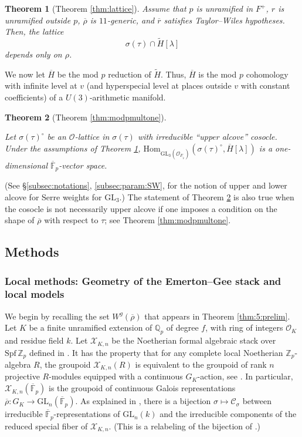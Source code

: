 \documentclass[oneside,a4paper,english, 11pt]{amsart}
\theoremstyle{plain}
\newtheorem{thm}{Theorem}[subsection]
\theoremstyle{plain}
\theoremstyle{plain}
\theoremstyle{plain}
\theoremstyle{plain}
\theoremstyle{plain}
\theoremstyle{definition}
\theoremstyle{definition}
\theoremstyle{definition}
\theoremstyle{remark}
\numberwithin{equation}{section}
\newcommand{\Qp}{\mathbb{Q}_p}
\newcommand{\F}{\mathbb{F}}
\newcommand{\cC}{\mathcal{C}}
\newcommand{\cO}{\mathcal{O}}
\newcommand{\cX}{\mathcal{X}}
\newcommand{\Zp}{\mathbb{Z}_p}
\newcommand{\Hom}{\mathrm{Hom}}
\newcommand{\GL}{\mathrm{GL}}
\newcommand{\tld}[1]{\widetilde{#1}}
\newcommand{\rbar}{\overline{r}}
\newcommand{\rhobar}{\overline{\rho}}
\newcommand{\Spf}{\mathrm{Spf}}
\newcommand{\ovl}[1]{\overline{#1}}
\begin{document}
\begin{thm}[Theorem \ref{thm:lattice}]
\label{mainthm1} 
Assume that $p$ is unramified in $F^+$, $r$ is unramified outside $p$, $\rhobar$ is $11$-generic, and $\rbar$ satisfies Taylor--Wiles hypotheses.
%
Then, the lattice 
\[
\sigma(\tau) \cap \tld{H}[\lambda]
\]
depends only on $\rho$.
\end{thm}

We now let $\overline{H}$ be the mod $p$ reduction of $\tld{H}$.
Thus, $\overline{H}$ is the mod $p$ cohomology with infinite level at $v$ (and hyperspecial level at places outside $v$ with constant coefficients) of a $U(3)$-arithmetic manifold.



%
%
%

\begin{thm}[Theorem \ref{thm:modpmultone}]
\label{thm:6:prelim}

%
%
Let $\sigma(\tau)^\circ$ be an $\cO$-lattice in $\sigma(\tau)$ with irreducible ``upper alcove'' cosocle.
%
Under the assumptions of Theorem \ref{mainthm1}, $\Hom_{\GL_3(\cO_{F_{\tld{v}}})}(\sigma(\tau)^\circ,\ovl{H}[\lambda])$ is a one-dimensional $\ovl{\F}_p$-vector space.
\end{thm}
\noindent (See \S \ref{subsec:notations}, \ref{subsec:param:SW}, for the notion of upper and lower alcove for Serre weights for $\GL_3$.)
The statement of Theorem \ref{thm:6:prelim} is also true when the cosocle is not necessarily upper alcove if one imposes a condition on the shape of $\rhobar$ with respect to $\tau$; see Theorem \ref{thm:modpmultone}.



\subsection{Methods}

\subsubsection{Local methods: Geometry of the Emerton--Gee stack and local models}

We begin by recalling the set $W^g(\rhobar)$ that appears in Theorem \ref{thm:5:prelim}.  
Let $K$ be a finite unramified extension of $\Qp$ of degree $f$, with ring of integers $\cO_K$ and residue field $k$. 
Let $\cX_{K,n}$ be the Noetherian formal algebraic stack over $\Spf\,\Zp$ defined in \cite[Definition 3.2.1]{EGstack}.
It has the property that for any complete local Noetherian $\Zp$-algebra $R$, the groupoid $\cX_{K,n}(R)$ is equivalent to the groupoid of rank $n$ projective $R$-modules equipped with a continuous $G_K$-action, see \cite[\S 3.6.1]{EGstack}.
In particular, $\cX_{K,n}(\ovl{\F}_p)$ is the groupoid of continuous Galois representations $\rhobar:G_K\rightarrow \GL_n(\ovl{\F}_p)$. 
%
As explained in \cite[\S 7.4]{MLM}, there is a bijection $\sigma\mapsto \cC_\sigma$  between irreducible $\overline{\F}_p$-representations of $\GL_n(k)$ and the irreducible components of the reduced special fiber of $\cX_{K,n}$.
(This is a relabeling of the bijection of \cite[Theorem 6.5.1]{EGstack}.)
\end{document}
